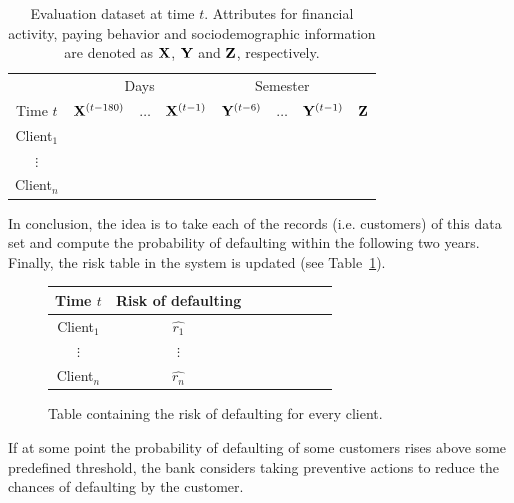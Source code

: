 \begin{itemize}
\begin{table}[htbp]
\centering
\begin{tabular}{c|ccc|ccc|c}
	&\multicolumn{3}{c|}{Days} & \multicolumn{3}{c|}{Semester} \\
     Time $t$              & $\mathbf{X}^{(t-180)}$ & $\ldots$ & $\mathbf{X}^{(t-1)} $ & $\mathbf{Y}^{(t-6)}$  & $\ldots$ & $\mathbf{Y}^{(t-1)} $ & $\mathbf{Z}$  \\  
\hline
Client$_1$  &                                                  &              &                     &                               &                     &        \\ 
$\vdots$      &                                                 &               &                     &                                &                     &      \\ 
Client$_n$  &                                                &               &                     &                                &                     &     \\ 
\end{tabular}
\caption{Evaluation dataset at time $t$. Attributes for financial activity, paying behavior and sociodemographic information are denoted as $\mathbf{X}$, $\mathbf{Y}$ and $\mathbf{Z}$, respectively.}
\label{tab:EvaluationDataset} 
\end{table}

In conclusion, the idea is to take each of the records (i.e. customers) of this data set and compute the probability of defaulting within the following two years. Finally, the risk table in the system is updated (see Table~\ref{tab:EvaluationDataset}).

\begin{figure}[h]
\centering
\begin{tabular}{c|ccc|ccc|c}
     Time $t$  & Risk of defaulting \\  
\hline
Client$_1$  &    $\hat{r_1}$  \\ 
$\vdots$      &   $\vdots$   \\ 
Client$_n$  &   $\hat{r_n}$  \\ 
\end{tabular} 
\caption{Table containing the risk of defaulting for every client.}
\label{tab:riskTable}
\end{figure}


If at some point the probability of defaulting of some customers rises above some predefined threshold, the bank considers taking preventive actions to reduce the chances of defaulting by the customer.


\end{itemize}
